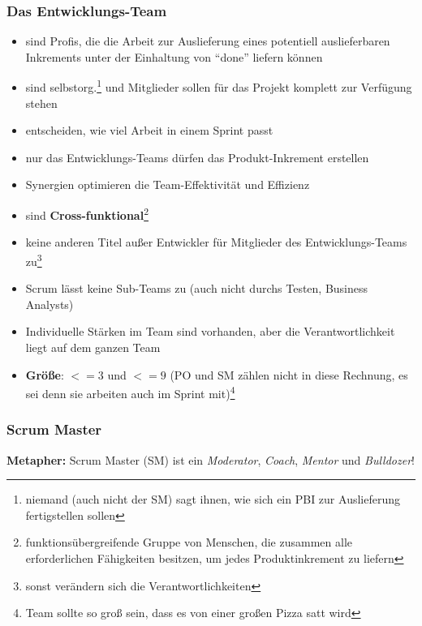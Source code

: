 \subsubsection{Das Entwicklungs-Team}
\begin{itemize}
  \item sind Profis, die die Arbeit zur Auslieferung eines potentiell auslieferbaren
    Inkrements unter der Einhaltung von \enquote{done} liefern können
  \item sind selbstorg.\footnote{niemand (auch nicht der SM) sagt ihnen, wie sich ein PBI zur
      Auslieferung fertigstellen sollen} und Mitglieder sollen für das Projekt komplett zur
    Verfügung stehen
  \item entscheiden, wie viel Arbeit in einem Sprint passt
  \item nur das Entwicklungs-Teams dürfen das Produkt-Inkrement erstellen
  \item Synergien optimieren die Team-Effektivität und Effizienz
  \item sind \textbf{Cross-funktional}\footnote{funktionsübergreifende Gruppe von Menschen, die
      zusammen alle erforderlichen Fähigkeiten besitzen, um jedes Produktinkrement zu
      liefern}
  \item keine anderen Titel außer Entwickler für Mitglieder des Entwicklungs-Teams zu\footnote{sonst
      verändern sich die Verantwortlichkeiten}
  \item Scrum lässt keine Sub-Teams zu (auch nicht durchs Testen, Business Analysts)
  \item Individuelle Stärken im Team sind vorhanden, aber die Verantwortlichkeit liegt auf dem
    ganzen Team
  \item \textbf{Größe}: $<= 3$ und $<= 9$ (PO und SM zählen nicht in diese Rechnung, es sei denn sie
    arbeiten auch im Sprint mit)\footnote{Team sollte so groß sein, dass es von einer großen Pizza
      satt wird}
\end{itemize}


\subsubsection{Scrum Master}
\textbf{Metapher:} Scrum Master (SM) ist ein \textit{Moderator}, \textit{Coach}, \textit{Mentor} und \textit{Bulldozer}!


